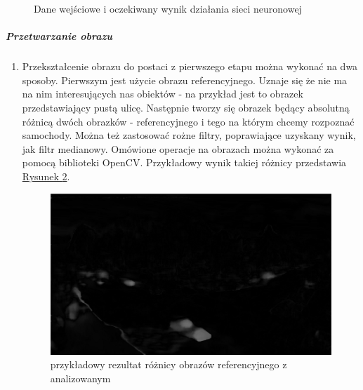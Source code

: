 \documentclass{article}
\begin{document}
\begin{figure}
\begin{center}
\begin{tabular}[c]{c c}
\end{tabular}
\end{center}
\caption{Dane wejściowe i oczekiwany wynik działania sieci neuronowej}
\label{fig:przyklad_dzialania}
\end{figure}

\subparagraph{Przetwarzanie obrazu}
\begin{enumerate}
\item Przekształcenie obrazu do postaci z pierwszego etapu można wykonać na dwa sposoby. Pierwszym jest użycie obrazu referencyjnego. Uznaje się że nie ma na nim interesujących nas obiektów - na przykład jest to obrazek przedstawiający pustą ulicę. Następnie tworzy się obrazek będący absolutną różnicą dwóch obrazków - referencyjnego i tego na którym chcemy rozpoznać samochody. Można też zastosować rożne filtry, poprawiające uzyskany wynik, jak filtr medianowy. Omówione operacje na obrazach można wykonać za pomocą biblioteki OpenCV.  Przykładowy wynik takiej różnicy przedstawia \hyperref[fig:absdiff]{Rysunek \ref*{fig:absdiff}}.

\begin{figure}[H]
\begin{center}
\includegraphics[scale=0.3]{przetwarzanie.png} 
\end{center}
\caption{przykładowy rezultat różnicy obrazów referencyjnego z analizowanym}
\label{fig:absdiff}
\end{figure}


\end{enumerate}
\end{document}
